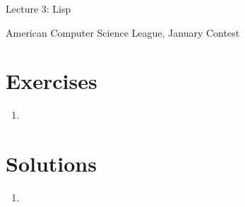 \documentclass[10pt]{article}
\begin{document}
    \noindent
    \begin{center}

        \hrulefill

        \vspace{5pt}

        \vspace{0pt}

        {\Large \hfill  Lecture 3: Lisp\hfill}
        \vspace{10pt}

        {\large \hfill  American Computer Science League, January Contest\hfill}
        \vspace{10pt}


        \vspace{-3pt}
        \hrulefill
    \end{center}

\section{Exercises}
\begin{enumerate}
    \item
\end{enumerate}

\newpage
\section{Solutions}
\begin{enumerate}
    \item
\end{enumerate}

\end{document}
